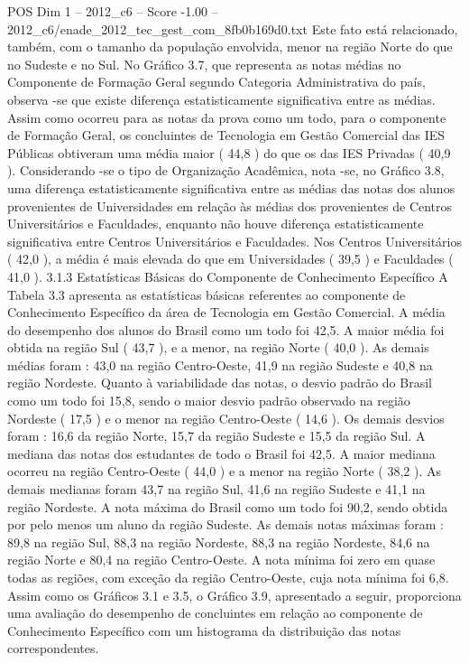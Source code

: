 \begin{textsample}{POS Dim 1 – 2012\_c6 – Score -1.00 – 2012\_c6/enade\_2012\_tec\_gest\_com\_8fb0b169d0.txt}
Este fato está relacionado, também, com o tamanho da população envolvida, menor na região Norte do que no Sudeste e no Sul.
No Gráfico 3.7, que representa as notas médias no Componente de Formação Geral segundo Categoria Administrativa do país, observa -se que existe diferença estatisticamente significativa entre as médias.
Assim como ocorreu para as notas da prova como um todo, para o componente de Formação Geral, os concluintes de Tecnologia em Gestão Comercial das IES Públicas obtiveram uma média maior ( 44,8 ) do que os das IES Privadas ( 40,9 ).
Considerando -se o tipo de Organização Acadêmica, nota -se, no Gráfico 3.8, uma diferença estatisticamente significativa entre as médias das notas dos alunos provenientes de Universidades em relação às médias dos provenientes de Centros Universitários e Faculdades, enquanto não houve diferença estatisticamente significativa entre Centros Universitários e Faculdades.
Nos Centros Universitários ( 42,0 ), a média é mais elevada do que em Universidades ( 39,5 ) e Faculdades ( 41,0 ). 3.1.3 Estatísticas Básicas do Componente de Conhecimento Específico A Tabela 3.3 apresenta as estatísticas básicas referentes ao componente de Conhecimento Específico da área de Tecnologia em Gestão Comercial.
A média do desempenho dos alunos do Brasil como um todo foi 42,5.
A maior média foi obtida na região Sul ( 43,7 ), e a menor, na região Norte ( 40,0 ).
As demais médias foram : 43,0 na região Centro-Oeste, 41,9 na região Sudeste e 40,8 na região Nordeste.
Quanto à variabilidade das notas, o desvio padrão do Brasil como um todo foi 15,8, sendo o maior desvio padrão observado na região Nordeste ( 17,5 ) e o menor na região Centro-Oeste ( 14,6 ).
Os demais desvios foram : 16,6 da região Norte, 15,7 da região Sudeste e 15,5 da região Sul.
A mediana das notas dos estudantes de todo o Brasil foi 42,5.
A maior mediana ocorreu na região Centro-Oeste ( 44,0 ) e a menor na região Norte ( 38,2 ).
As demais medianas foram 43,7 na região Sul, 41,6 na região Sudeste e 41,1 na região Nordeste.
A nota máxima do Brasil como um todo foi 90,2, sendo obtida por pelo menos um aluno da região Sudeste.
As demais notas máximas foram : 89,8 na região Sul, 88,3 na região Nordeste, 88,3 na região Nordeste, 84,6 na região Norte e 80,4 na região Centro-Oeste.
A nota mínima foi zero em quase todas as regiões, com exceção da região Centro-Oeste, cuja nota mínima foi 6,8.
Assim como os Gráficos 3.1 e 3.5, o Gráfico 3.9, apresentado a seguir, proporciona uma avaliação do desempenho de concluintes em relação ao componente de Conhecimento Específico com um histograma da distribuição das notas correspondentes.

\end{textsample}
